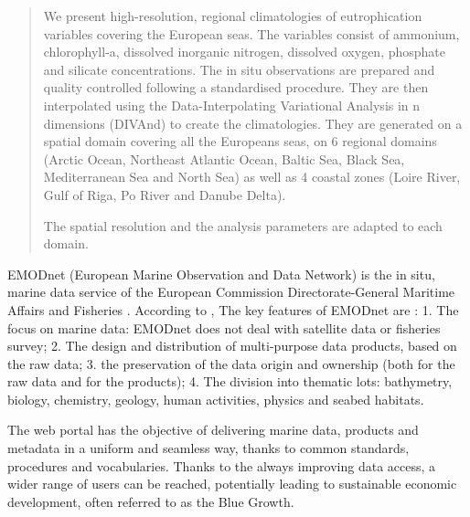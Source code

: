 \documentclass[essd, manuscript]{copernicus}
\begin{document}
\begin{abstract}
We present high-resolution, regional climatologies of eutrophication variables covering the European seas. The variables consist of ammonium, chlorophyll-a, dissolved inorganic nitrogen, dissolved oxygen, phosphate and silicate concentrations. The in situ observations are prepared and quality controlled following a standardised procedure. They are then interpolated using the Data-Interpolating Variational Analysis in n dimensions (DIVAnd) to create the climatologies. They are generated on a spatial domain covering all the Europeans seas, on 6 regional domains (Arctic Ocean, Northeast Atlantic Ocean, Baltic Sea, Black Sea, Mediterranean Sea and North Sea) as well as 4 coastal zones (Loire River, Gulf of Riga, Po River and Danube Delta).

The spatial resolution and the analysis parameters are adapted to each domain.
\end{abstract}


\introduction  %

EMODnet (European Marine Observation and Data Network) is the in situ, marine data service of the European Commission Directorate-General Maritime Affairs and Fisheries \citep{MartinMiguez2019}. According to \citet{Shepherd2018}, The key features of EMODnet are : 1. The focus on marine data: EMODnet does not deal with satellite data or fisheries survey; 2. The design and distribution of multi-purpose data products, based on the raw data; 3. the preservation of the data origin and ownership (both for the raw data and for the products); 4. The division into thematic lots: bathymetry, biology, chemistry, geology, human activities, physics and seabed habitats. 

The web portal has the objective of delivering marine data, products and metadata in a uniform and seamless way, thanks to common standards, procedures and vocabularies. Thanks to the always improving data access, a wider range of users can be reached, potentially leading to sustainable economic development, often referred to as the Blue Growth. 
\end{document}
